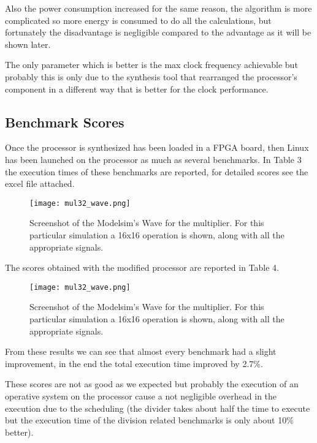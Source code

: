 Also the power consumption increased for the same reason, the algorithm is more complicated so
more energy is consumed to do all the calculations, but fortunately the disadvantage is negligible
compared to the advantage as it will be shown later.

The only parameter which is better is the max clock frequency achievable but probably this is only
due to the synthesis tool that rearranged the processor's component in a different way that is
better for the clock performance.

\subsection{Benchmark Scores}

Once the processor is synthesized has been loaded in a FPGA board, then Linux has been launched
on the processor as much as several benchmarks. In Table 3 the execution times of these
benchmarks are reported, for detailed scores see the excel file attached.

\begin{figure}[H]
\centering
\texttt{[image: mul32\_wave.png]}
\caption{Screenshot of the Modelsim's Wave for the multiplier. For this particular simulation a 16x16 operation is shown, along with all the appropriate signals.}
\label{fig:mul32_wave}
\end{figure}

The scores obtained with the modified processor are reported in Table 4.

\begin{figure}[H]
\centering
\texttt{[image: mul32\_wave.png]}
\caption{Screenshot of the Modelsim's Wave for the multiplier. For this particular simulation a 16x16 operation is shown, along with all the appropriate signals.}
\label{fig:mul32_wave}
\end{figure}

From these results we can see that almost every benchmark had a slight improvement, in the end
the total execution time improved by 2.7\%.

These scores are not as good as we expected but probably the execution of an operative system
on the processor cause a not negligible overhead in the execution due to the scheduling (the
divider takes about half the time to execute but the execution time of the division related
benchmarks is only about 10\% better).

